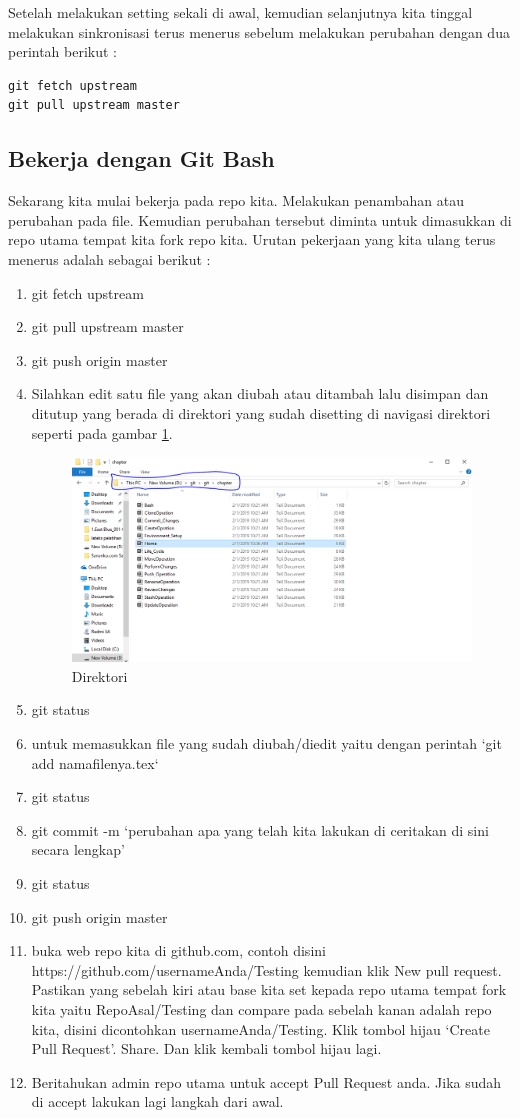 Setelah melakukan setting sekali di awal, kemudian selanjutnya kita tinggal melakukan sinkronisasi terus menerus sebelum melakukan perubahan dengan dua perintah berikut :
\begin{verbatim}
git fetch upstream
git pull upstream master
\end{verbatim}


\subsection{Bekerja dengan Git Bash}
Sekarang kita mulai bekerja pada repo kita. Melakukan penambahan atau perubahan pada file. Kemudian perubahan tersebut diminta untuk dimasukkan di repo utama tempat kita fork repo kita. Urutan pekerjaan yang kita ulang terus menerus adalah sebagai berikut :
\begin{enumerate}
\item git fetch upstream
\item git pull upstream master
\item git push origin master
\item Silahkan edit satu file yang akan diubah atau ditambah lalu disimpan dan ditutup yang berada di direktori yang sudah disetting di navigasi direktori seperti pada gambar \ref{penanda}.
    \begin{figure}[!htbp]
        \centering
            \includegraphics[width=.85\textwidth]{Figures/Capture}
            \caption{Direktori}
        \label{penanda}
    \end{figure}
\item git status
\item untuk memasukkan file yang sudah diubah/diedit yaitu dengan perintah `git add namafilenya.tex`
\item git status
\item git commit -m `perubahan apa yang telah kita lakukan di ceritakan di sini secara lengkap'
\item git status
\item git push origin master
\item buka web repo kita di github.com, contoh disini https://github.com/usernameAnda/Testing kemudian klik New pull request. Pastikan yang sebelah kiri atau base kita set kepada repo utama tempat fork kita yaitu RepoAsal/Testing dan compare pada sebelah kanan adalah repo kita, disini dicontohkan usernameAnda/Testing. Klik tombol hijau `Create Pull Request'. Share. Dan klik kembali tombol hijau lagi.
\item Beritahukan admin repo utama untuk accept Pull Request anda. Jika sudah di accept lakukan lagi langkah dari awal.
\end{enumerate} 